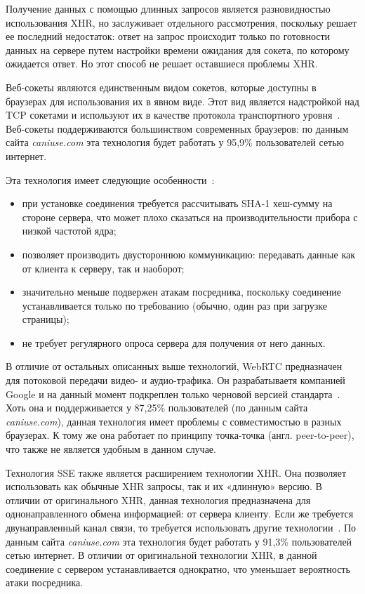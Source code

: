 
Получение данных с помощью длинных запросов является разновидностью использования
XHR, но заслуживает отдельного рассмотрения, поскольку решает ее последний недостаток:
ответ на запрос происходит только по готовности данных на сервере путем настройки
времени ожидания для сокета, по которому ожидается ответ. Но этот способ не решает
оставшиеся проблемы XHR.

Веб-сокеты являются единственным видом сокетов, которые доступны в браузерах
для использования их в явном виде. Этот вид является надстройкой над TCP сокетами
и используют их в качестве протокола транспортного уровня~\cite{websock_rfc}.
Веб-сокеты поддерживаются большинством современных браузеров: по данным сайта
\textit{caniuse.com} эта технология будет работать у 95,9\% пользователей
сетью интернет.

Эта технология имеет следующие особенности~\cite{websock_rfc}:
\begin{itemize}
    \item при установке соединения требуется рассчитывать SHA-1 хеш-сум\-му на стороне
        сервера, что может плохо сказаться на производительности прибора с низкой
        частотой ядра;
    \item позволяет производить двустороннюю коммуникацию: передавать данные как
        от клиента к серверу, так и наоборот;
    \item значительно меньше подвержен атакам посредника, поскольку соединение
        устанавливается только по требованию (обычно, один раз при загрузке страницы);
    \item не требует регулярного опроса сервера для получения от него данных.
\end{itemize}

В отличие от остальных описанных выше технологий, WebRTC предназначен для потоковой
передачи видео- и аудио-трафика. Он разрабатываетя компанией Google и на данный момент
подкреплен только черновой версией стандарта~\cite{w3c_webrtc_site}. Хоть она и
поддерживается у 87,25\% пользователей (по данным сайта \textit{caniuse.com}),
данная технология имеет проблемы с совместимостью в разных браузерах.
К тому же она работает по принципу точка-точка (англ. peer-to-peer), что также
не является удобным в данном случае.

Технология SSE также является расширением технологии XHR. Она позволяет использовать
как обычные XHR запросы, так и их «длинную» версию. В отличии от оригинального XHR,
данная технология предназначена для однонаправленного обмена информацией: от сервера
клиенту. Если же требуется двунаправленный канал связи, то требуется использовать
другие технологии~\cite{professional_js_book}. По данным сайта \textit{caniuse.com}
эта технология будет работать у 91,3\% пользователей сетью интернет.
В отличии от оригинальной технологии XHR, в данной соединение с сервером
устанавливается однократно, что уменьшает вероятность атаки посредника.

